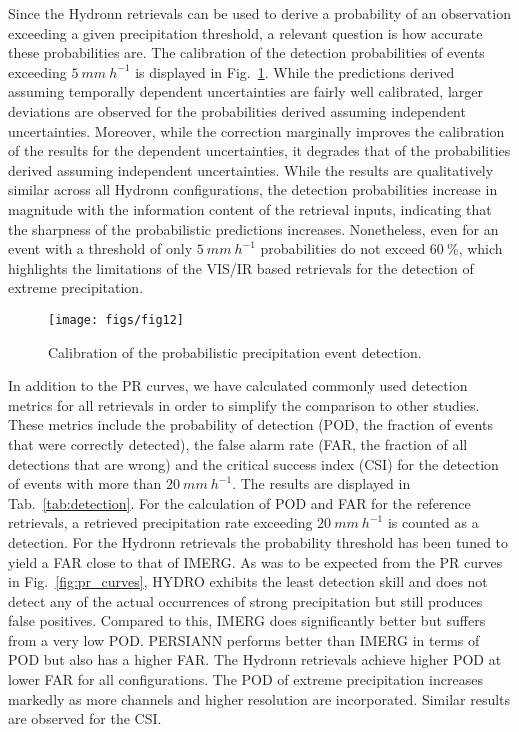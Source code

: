 \documentclass[journal abbreviation, manuscript]{copernicus}
\begin{document}
Since the Hydronn retrievals can be used to derive a probability of an
observation exceeding a given precipitation threshold, a relevant question is
how accurate these probabilities are. The calibration of the detection
probabilities of events exceeding $5\ \unit{mm\ h^{-1}}$ is displayed in
Fig.~\ref{fig:classification_calibration}. While the predictions derived
assuming temporally dependent uncertainties are fairly well calibrated, larger
deviations are observed for the probabilities derived assuming independent
uncertainties. Moreover, while the correction marginally improves the
calibration of the results for the dependent uncertainties, it degrades that of
the probabilities derived assuming independent uncertainties. While the results
are qualitatively similar across all Hydronn configurations, the detection
probabilities increase in magnitude with the information content of the
retrieval inputs, indicating that the sharpness of the probabilistic predictions
increases. Nonetheless, even for an event with a threshold of only
$5\ \unit{mm\ h^{-1}}$ probabilities do not exceed $60\ \unit{\%}$, which
highlights the limitations of the VIS/IR based retrievals for the detection of
extreme precipitation.

\begin{figure}
  \centering
  \texttt{[image: figs/fig12]}
  \caption{
    Calibration of the probabilistic precipitation event detection. 
    }
  \label{fig:classification_calibration}
\end{figure}

In addition to the PR curves, we have calculated commonly used detection metrics
for all retrievals in order to simplify the comparison to other studies. These
metrics include the probability of detection (POD, the fraction of events that
were correctly detected), the false alarm rate (FAR, the fraction of all
detections that are wrong) and the critical success index (CSI) for the
detection of events with more than $20\ \unit{mm \ h^{-1}}$. The results are
displayed in Tab.~\ref{tab:detection}. For the calculation of POD and FAR for
the reference retrievals, a retrieved precipitation rate exceeding
$20\ \unit{mm\ h^{-1}}$ is counted as a detection. For the Hydronn retrievals
the probability threshold has been tuned to yield a FAR close to that of IMERG.
As was to be expected from the PR curves in Fig.~\ref{fig:pr_curves}, HYDRO
exhibits the least detection skill and does not detect any of the actual
occurrences of strong precipitation but still produces false positives. Compared
to this, IMERG does significantly better but suffers from a very low POD.
PERSIANN performs better than IMERG in terms of POD but also has a higher FAR.
The Hydronn retrievals achieve higher POD at lower FAR for all configurations.
The POD of extreme precipitation increases markedly as more channels and higher
resolution are incorporated. Similar results are observed for the CSI.
\end{document}
